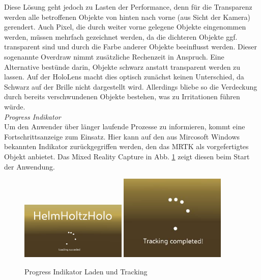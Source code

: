 Diese Lösung geht jedoch zu Lasten der Performance, denn für die Transparenz werden alle betroffenen Objekte von hinten nach vorne (aus Sicht der Kamera) gerendert. Auch Pixel, die durch weiter vorne gelegene Objekte eingenommen werden, müssen mehrfach gezeichnet werden, da die dichteren Objekte ggf. transparent sind und durch die Farbe anderer Objekte beeinflusst werden. Dieser sogenannte Overdraw nimmt zusätzliche Rechenzeit in Anspruch. Eine Alternative bestünde darin, Objekte schwarz anstatt transparent werden zu lassen. Auf der HoloLens macht dies optisch zunächst keinen Unterschied, da Schwarz auf der Brille nicht dargestellt wird. Allerdings bliebe so die Verdeckung durch bereits verschwundenen Objekte bestehen, was zu Irritationen führen würde.\\

\textit{Progress Indikator}\\
Um den Anwender über länger laufende Prozesse zu informieren, kommt eine Fortschrittsanzeige zum Einsatz. Hier kann auf den aus Mircosoft Windows bekannten Indikator zurückgegriffen werden, den das MRTK als vorgefertigtes Objekt anbietet. Das Mixed Reality Capture in Abb. \ref{img:pi-and-tracking} zeigt diesen beim Start der Anwendung.\\

\begin{figure}[H]
	\centering
	\includegraphics[width=0.45\textwidth]{images/loading.jpg}
	\hspace{0.05cm}	
	\includegraphics[width=0.45\textwidth]{images/tracking.jpg}
	\caption{Progress Indikator Laden und Tracking}
	\label{img:pi-and-tracking}
\end{figure}

